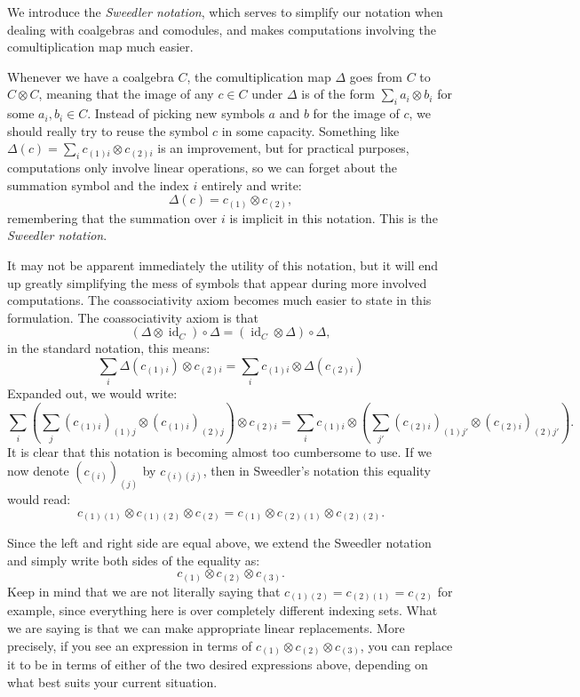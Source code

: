 \documentclass{article}
\theoremstyle{plain}
\theoremstyle{definition}
\DeclareMathOperator{\id}{id}
\begin{document}
 We introduce the \textit{Sweedler notation}, which serves to simplify our notation when dealing with coalgebras and comodules, and makes computations involving the comultiplication map much easier.
 
Whenever we have a coalgebra $C$, the comultiplication map $\Delta$ goes from $C$ to $C\otimes C$, meaning that the image of any $c\in C$ under $\Delta$ is of the form $\sum_i a_i\otimes b_i$ for some $a_i, b_i\in C$. Instead of picking new symbols $a$ and $b$ for the image of $c$, we should really try to reuse the symbol $c$ in some capacity. Something like $\Delta(c)=\sum_i c_{(1)i} \otimes c_{(2)i}$ is an improvement, but for practical purposes, computations only involve linear operations, so we can forget about the summation symbol and the index $i$ entirely and write: 
\[
\Delta(c)=c_{(1)}\otimes c_{(2)},
\]
remembering that the summation over $i$ is implicit in this notation. This is the \textit{Sweedler notation}.

It may not be apparent immediately the utility of this notation, but it will end up greatly simplifying the mess of symbols that appear during more involved computations. The coassociativity axiom becomes much easier to state in this formulation. The coassociativity axiom is that 
\[
(\Delta\otimes \id_C)\circ \Delta=(\id_C\otimes \Delta)\circ \Delta,
\]
 in the standard notation, this means: 
 \[
 \sum_i \Delta(c_{(1)i}) \otimes c_{(2)i}=\sum_i c_{(1)i} \otimes \Delta(c_{(2)i})
 \]
Expanded out, we would write:
 \[
  \sum_i \left(\sum_j (c_{(1)i})_{(1)j} \otimes (c_{(1)i})_{(2)j}\right) \otimes  c_{(2)i}=\sum_i c_{(1)i}\otimes \left(\sum_{j'} (c_{(2)i})_{(1)j'} \otimes (c_{(2)i})_{(2)j'}\right).
 \]
 It is clear that this notation is becoming almost too cumbersome to use. If we now denote $(c_{(i)})_{(j)}$ by $c_{(i)(j)}$, then in Sweedler's notation this equality would read: 
 \[
 c_{(1)(1)} \otimes c_{(1)(2)} \otimes c_{(2)} = c_{(1)} \otimes c_{(2)(1)} \otimes c_{(2)(2)}.
 \]

 Since the left and right side are equal above, we extend the Sweedler notation and simply write both sides of the equality as: 
 \[
 c_{(1)}\otimes c_{(2)} \otimes c_{(3)}.
 \]
Keep in mind that we are not literally saying that $c_{(1)(2)} = c_{(2)(1)}=c_{(2)}$ for example, since everything here is over completely different indexing sets. What we are saying is that we can make appropriate linear replacements. More precisely, if you see an expression in terms of $c_{(1)}\otimes c_{(2)}\otimes c_{(3)}$, you can replace it to be in terms of either of the two desired expressions above, depending on what best suits your current situation.
\end{document}
